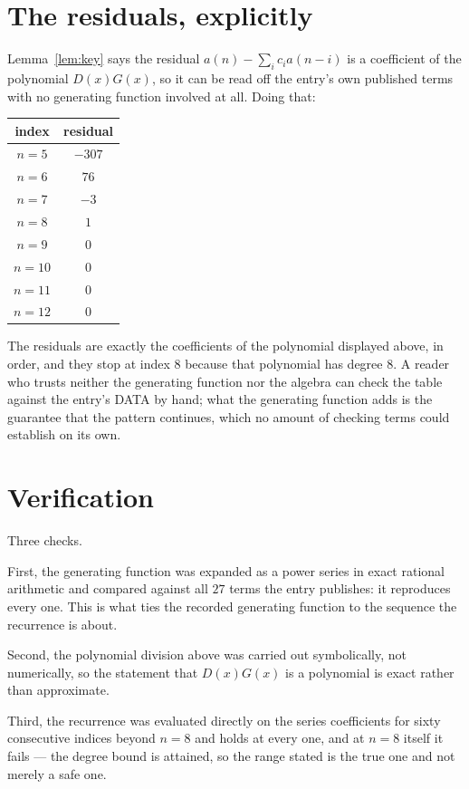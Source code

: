 \documentclass[11pt,a4paper]{article}
\theoremstyle{plain}
\theoremstyle{definition}
\begin{document}
\section{The residuals, explicitly}

Lemma~\ref{lem:key} says the residual $a(n)-\sum_ic_ia(n-i)$ is a coefficient of the
polynomial $D(x)G(x)$, so it can be read off the entry's own published terms with no
generating function involved at all. Doing that:
\begin{center}
\begin{tabular}{cc}
index & residual \\ \hline
$n=5$ & $-307$ \\
$n=6$ & $76$ \\
$n=7$ & $-3$ \\
$n=8$ & $1$ \\
$n=9$ & $0$ \\
$n=10$ & $0$ \\
$n=11$ & $0$ \\
$n=12$ & $0$
\end{tabular}
\end{center}
The residuals are exactly the coefficients of the polynomial displayed above, in order, and
they stop at index $8$ because that polynomial has degree $8$. A reader who trusts
neither the generating function nor the algebra can check the table against the entry's DATA
by hand; what the generating function adds is the guarantee that the pattern continues, which
no amount of checking terms could establish on its own.

\section{Verification}

Three checks.

First, the generating function was expanded as a power series in exact rational arithmetic and
compared against all $27$ terms the entry publishes: it reproduces every one. This is
what ties the recorded generating function to the sequence the recurrence is about.

Second, the polynomial division above was carried out symbolically, not numerically, so the
statement that $D(x)G(x)$ is a polynomial is exact rather than approximate.

Third, the recurrence was evaluated directly on the series coefficients for sixty consecutive
indices beyond $n=8$ and holds at every one, and at $n=8$ itself it fails --- the
degree bound is attained, so the range stated is the true one and not merely a safe one.
\end{document}

